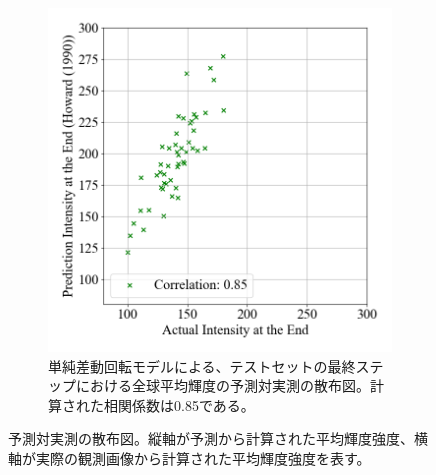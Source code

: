 \begin{figure}[htbp]
\begin{subfigure}[b]{0.55\textwidth}
            \includegraphics[width=\textwidth]{figures/exp2/intensity_scatter_gt_dr.png}
            \caption{単純差動回転モデルによる、テストセットの最終ステップにおける全球平均輝度の予測対実測の散布図。計算された相関係数は0.85である。}
          \end{subfigure}
          \label{fig:exp2_dr_scatter}
          \caption{予測対実測の散布図。縦軸が予測から計算された平均輝度強度、横軸が実際の観測画像から計算された平均輝度強度を表す。}
        \end{figure}

